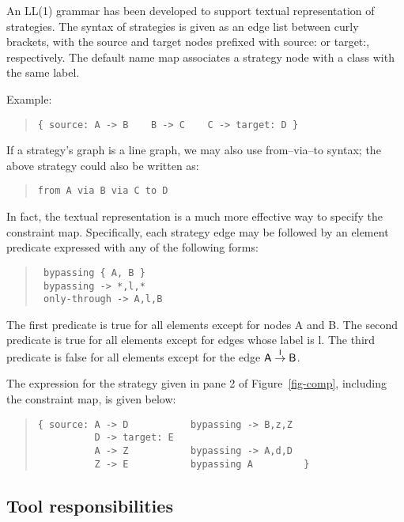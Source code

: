 An LL(1) grammar has been developed to support textual representation
of strategies.  The syntax of strategies is given as an edge list
between curly brackets, with the source and target nodes prefixed with
{\sf source:} or {\sf target:}, respectively.  The default name map
associates a strategy node with a class with the same label.

Example:
\begin{quote}
\begin{verbatim}
{ source: A -> B    B -> C    C -> target: D }
\end{verbatim}
\end{quote}
If a strategy's graph is a line graph, we may also use 
from--via--to syntax; the above strategy could also be written as:
\begin{quote}
\begin{verbatim}
from A via B via C to D
\end{verbatim}
\end{quote}

In fact, the textual representation is a much more effective way to
specify the constraint map.  Specifically, each strategy edge may be
followed by an element predicate expressed with any of the following
forms:
\begin{quote}
\begin{verbatim}
 bypassing { A, B }
 bypassing -> *,l,*
 only-through -> A,l,B
\end{verbatim}
\end{quote}
The first predicate is true for all elements except for nodes {\sf A}
and {\sf B}.  The second predicate is true for all elements except for
edges whose label is {\sf l}. The third predicate is false for all
elements except for the edge $\mathsf A\stackrel{\mathsf l}{\rightarrow}\mathsf B$.

The expression for the strategy given in pane 2 of Figure~\ref{fig-comp},
including the constraint map, is given below:
\begin{quote}
\begin{verbatim}
{ source: A -> D           bypassing -> B,z,Z
          D -> target: E
          A -> Z           bypassing -> A,d,D
          Z -> E           bypassing A         }
\end{verbatim} 
\end{quote}

\subsection{Tool responsibilities}
\label{ssec-tools}

